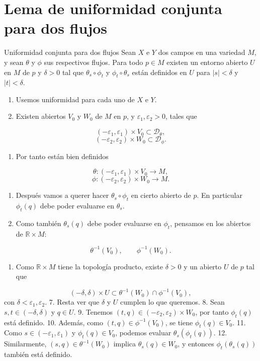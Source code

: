 \section{Lema de uniformidad conjunta para dos flujos}
\begin{booklemma}{Uniformidad conjunta para dos flujos}
Sean $X$ e $Y$ dos campos en una variedad $M$, y sean $\theta$ y $\phi$ sus respectivos flujos. Para todo $p\in M$ existen un entorno abierto $U$ en $M$ de $p$ y $\delta>0$ tal que $\theta_s\circ\phi_t$ y $\phi_t\circ\theta_s$ están definidos en $U$ para $|s|<\delta$ y $|t|<\delta$.

\end{booklemma}
\begin{bookproof}{}
\begin{enumerate}
\item Usemos uniformidad para cada uno de $X$ e $Y$.
\item Existen abiertos $V_0$ y $W_0$ de $M$ en $p$, y $\varepsilon_1,\varepsilon_2>0$, tales que
\end{enumerate}
\[
(-\varepsilon_1,\varepsilon_1)\times V_0\subset\mathcal D_\theta,
\]
\[
(-\varepsilon_2,\varepsilon_2)\times W_0\subset\mathcal D_\phi.
\]
\begin{enumerate}[start=3]
\item Por tanto están bien definidos
\end{enumerate}
\[
\theta:(-\varepsilon_1,\varepsilon_1)\times V_0\to M,
\]
\[
\phi:(-\varepsilon_2,\varepsilon_2)\times W_0\to M.
\]
\begin{enumerate}[start=4]
\item Después vamos a querer hacer $\theta_s\circ\phi_t$ en cierto abierto de $p$. En particular $\phi_t(q)$ debe poder evaluarse en $\theta_s$.
\item Como también $\theta_s(q)$ debe poder evaluarse en $\phi_t$, pensamos en los abiertos de $\mathbb R\times M$:
\end{enumerate}
\[
\theta^{-1}(V_0),\qquad \phi^{-1}(W_0).
\]
\begin{enumerate}[start=6]
\item Como $\mathbb R\times M$ tiene la topología producto, existe $\delta>0$ y un abierto $U$ de $p$ tal que
\end{enumerate}
\[
(-\delta,\delta)\times U\subset \theta^{-1}(W_0)\cap\phi^{-1}(V_0),
\]
con $\delta<\varepsilon_1,\varepsilon_2$. 7. Resta ver que $\delta$ y $U$ cumplen lo que queremos. 8. Sean $s,t\in(-\delta,\delta)$ y $q\in U$. 9. Tenemos $(t,q)\in(-\varepsilon_2,\varepsilon_2)\times W_0$, por tanto $\phi_t(q)$ está definido. 10. Además, como $(t,q)\in\phi^{-1}(V_0)$, se tiene $\phi_t(q)\in V_0$. 11. Como $s\in(-\varepsilon_1,\varepsilon_1)$ y $\phi_t(q)\in V_0$, podemos evaluar $\theta_s(\phi_t(q))$. 12. Similarmente, $(s,q)\in\theta^{-1}(W_0)$ implica $\theta_s(q)\in W_0$, y entonces $\phi_t(\theta_s(q))$ también está definido.

\bookqed
\end{bookproof}
